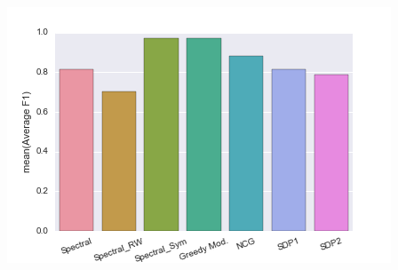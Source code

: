 \documentclass{beamer}
\theoremstyle{definition}
\theoremstyle{plain}
\theoremstyle{remark}
\begin{document}
\begin{frame}{}
\begin{columns}
						\includegraphics[width=0.9\linewidth]{karate_AverageF1.png}
				\end{columns}
				
		\end{frame}


	\section*{}

		\begin{frame}{}
		\end{frame}
\end{document}
